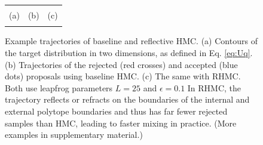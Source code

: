 \documentclass{article} %
\begin{document}
\begin{figure}[t!]
\begin{center}
\begin{tabular}{ccc}
\vspace{-3.5mm}
\\
   \footnotesize(a) 
& \footnotesize(b) 
& \footnotesize(c) 
\\
\multicolumn{2}{c}{}
\end{tabular}
\end{center}
\vspace{-8mm}
\caption{\footnotesize
Example trajectories of baseline and reflective HMC. (a) Contours of the target distribution in two dimensions, as defined in Eq. \ref{eq:Uq}. (b) Trajectories of the rejected (red crosses) and accepted (blue dots) proposals using baseline HMC. (c) The same with RHMC. Both use leapfrog parameters $L=25$ and $\epsilon=0.1$ In RHMC, the trajectory reflects or refracts on the boundaries of the internal and external polytope boundaries and thus has far fewer rejected samples than HMC, leading to faster mixing in practice. (More examples in supplementary material.)} 
\label{fig:mom}
\vspace{-10pt}
\end{figure}
\end{document}
